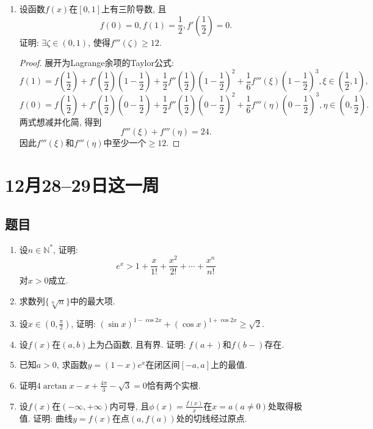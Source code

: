 \documentclass[UTF8,11pt, a4paper, oneside, fontset=none]{ctexbook}
\begin{document}
\begin{enumerate}
\item 设函数$f(x)$在$[0, 1]$上有三阶导数, 且
\[
f(0) = 0, f(1) = \frac{1}{2}, f'\left( \frac{1}{2} \right) =0.
\]
证明: $\exists \zeta \in (0, 1)$, 使得$f'''(\zeta) \geq 12$.


\begin{proof}

展开为Lagrange余项的Taylor公式:
\[
f(1) = f(\frac{1}{2}) + f'(\frac{1}{2}) (1 - \frac{1}{2}) + \frac{1}{2} f''(\frac{1}{2}) (1 - \frac{1}{2})^2 + \frac{1}{6} f'''(\xi) (1 - \frac{1}{2})^3, \xi \in (\frac{1}{2}, 1),
\]
\[
f(0) = f(\frac{1}{2}) +f'(\frac{1}{2}) (0 - \frac{1}{2}) + \frac{1}{2} f''(\frac{1}{2}) (0 - \frac{1}{2})^2 + \frac{1}{6} f'''(\eta) (0 - \frac{1}{2})^3, \eta \in (0, \frac{1}{2}).
\]
两式想减并化简, 得到
\[
f'''(\xi) + f'''(\eta) = 24.
\]
因此$f'''(\xi)$和$f'''(\eta)$中至少一个$\geq 12$.

\end{proof}


\end{enumerate}

\clearpage

\section{12月28--29日这一周}

\subsection*{题目}

\begin{enumerate}

\item 设$n \in \mathbb N^*$, 证明:
\[
e^x > 1 + \frac{x}{1!} + \frac{x^2}{2!} + \cdots + \frac{x^n}{n!}
\]
对$x > 0$成立.

\item 求数列$\{\sqrt[n]{n} \}$中的最大项.

\item 设$x \in (0, \frac{\pi}{2})$, 证明: $(\sin x)^{1 - \cos 2x} + (\cos x)^{1 + \cos 2x} \geq \sqrt 2$.

\item 设$f(x)$在$(a, b)$上为凸函数, 且有界. 证明: $f(a+)$和$f(b-)$存在.

\item 已知$a > 0$, 求函数$y = (1 - x)e^x$在闭区间$[-a, a]$上的最值.

\item 证明$4 \arctan x - x + \frac{4 \pi}{3} - \sqrt 3 =0$恰有两个实根.

\item 设$f(x)$在$(-\infty, +\infty)$内可导, 且$\phi(x) = \frac{f(x)}{x}$在$x = a (a \neq 0)$处取得极值. 证明: 曲线$y = f(x)$在点$(a, f(a))$处的切线经过原点.

\end{enumerate}
\end{document}
